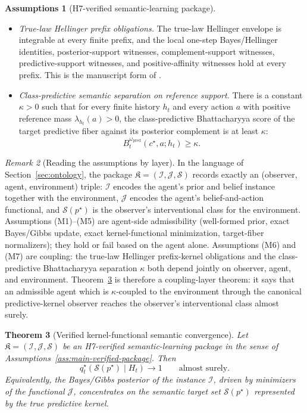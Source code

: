 \documentclass[11pt]{article}
\newtheorem{theorem}{Theorem}[section]
\theoremstyle{definition}
\newtheorem{assumptions}[theorem]{Assumptions}
\theoremstyle{remark}
\newtheorem{remark}[theorem]{Remark}
\newcommand{\Scal}{\mathcal{S}}
\begin{document}
\begin{assumptions}[H7-verified semantic-learning package]
\begin{itemize}
\[
0<
q_t^\star(c^\star\mid h_t)
\qquad\text{and}\qquad
q_t^\star(c^\star\mid h_t)<\infty
\]
in the extended-real normalizer sense used by the Lean development.
\item[(M6)] \emph{True-law Hellinger prefix obligations.} The true-law Hellinger envelope is integrable at every finite prefix, and the local one-step Bayes/Hellinger identities, posterior-support witnesses, complement-support witnesses, predictive-support witnesses, and positive-affinity witnesses hold at every prefix. This is the manuscript form of .
\item[(M7)] \emph{Class-predictive semantic separation on reference support.} There is a constant $\kappa>0$ such that for every finite history $h_t$ and every action $a$ with positive reference mass $\lambda_{h_t}(a)>0$, the class-predictive Bhattacharyya score of the target predictive fiber against its posterior complement is at least $\kappa$:
\[
B_t^{\omega_{\mathrm{pred}}}(c^\star,a;h_t)\ge \kappa.
\]
\end{itemize}
\end{assumptions}

\begin{remark}[Reading the assumptions by layer]
\label{rem:main-by-layer}
In the language of Section~\ref{sec:ontology}, the package $\mathfrak K=(\mathcal I,\mathcal J,\Scal)$ records exactly an (observer, agent, environment) triple: $\mathcal I$ encodes the agent's prior and belief instance together with the environment, $\mathcal J$ encodes the agent's belief-and-action functional, and $\Scal(p^\star)$ is the observer's interventional class for the environment. Assumptions \textup{(M1)--(M5)} are agent-side admissibility (well-formed prior, exact Bayes/Gibbs update, exact kernel-functional minimization, target-fiber normalizers); they hold or fail based on the agent alone. Assumptions \textup{(M6)} and \textup{(M7)} are coupling: the true-law Hellinger prefix-kernel obligations and the class-predictive Bhattacharyya separation $\kappa$ both depend jointly on observer, agent, and environment. Theorem~\ref{thm:separating-support-convergence} is therefore a coupling-layer theorem: it says that an admissible agent which is $\kappa$-coupled to the environment through the canonical predictive-kernel observer reaches the observer's interventional class almost surely.
\end{remark}

\begin{theorem}[Verified kernel-functional semantic convergence]
\label{thm:separating-support-convergence}
Let $\mathfrak K=(\mathcal I,\mathcal J,\Scal)$ be an H7-verified semantic-learning package in the sense of Assumptions~\ref{ass:main-verified-package}. Then
\[
q_t^\star(\Scal(p^\star)\mid H_t)\longrightarrow 1
\qquad
\text{almost surely.}
\]
Equivalently, the Bayes/Gibbs posterior of the instance $\mathcal I$, driven by minimizers of the functional $\mathcal J$, concentrates on the semantic target set $\Scal(p^\star)$ represented by the true predictive kernel.
\end{theorem}
\end{document}

